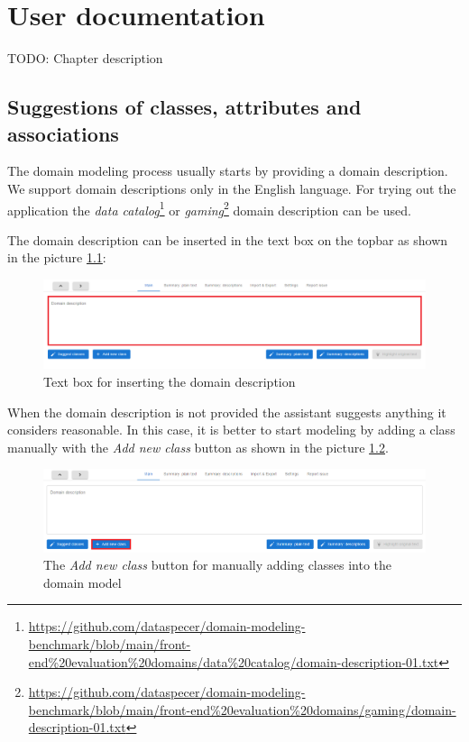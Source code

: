 \chapter{User documentation}
\label{chap:user_documentation}

\noindent{}TODO: Chapter description


\section{Suggestions of classes, attributes and associations}

The domain modeling process usually starts by providing a domain description. We support domain descriptions only in the English language. For trying out the application the \textit{data catalog}\footnote{\url{https://github.com/dataspecer/domain-modeling-benchmark/blob/main/front-end\%20evaluation\%20domains/data\%20catalog/domain-description-01.txt}} or \textit{gaming}\footnote{\url{https://github.com/dataspecer/domain-modeling-benchmark/blob/main/front-end\%20evaluation\%20domains/gaming/domain-description-01.txt}} domain description can be used.

The domain description can be inserted in the text box on the topbar as shown in the picture \ref{fig:domain-description-text-box}:

\begin{figure}[!h]
    \includegraphics[scale=0.35]{../docs/images/frontend/insert-domain-description.png}
    \caption{\centering Text box for inserting the domain description}
    \label{fig:domain-description-text-box}
\end{figure}

When the domain description is not provided the assistant suggests anything it considers reasonable. In this case, it is better to start modeling by adding a class manually with the \textit{Add new class} button as shown in the picture \ref{fig:add_new_class}.

\begin{figure}[!h]
    \includegraphics[scale=0.36]{../docs/images/frontend/add-new-class-manually.png}
    \caption{\centering The \textit{Add new class} button for manually adding classes into the domain model}
    \label{fig:add_new_class}
\end{figure}


